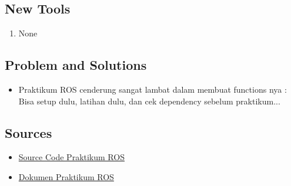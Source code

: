 \documentclass{article}
\begin{document}
\subsection{New Tools}
\begin{enumerate}
    \item None
\end{enumerate}

\subsection{Problem and Solutions}
\begin{itemize}
    \item Praktikum ROS cenderung sangat lambat dalam membuat functions nya : Bisa setup dulu, latihan dulu, dan cek dependency sebelum praktikum... 
\end{itemize}

\subsection{Sources}
\begin{itemize}
    \item \href{https://github.com/BrianHadianSTEI23/CaRSC_19623254_PrakROS}{Source Code Praktikum ROS}
    \item \href{https://docs.google.com/document/d/12mYMcLWI9S0xcYhLUiTBNpxYLnoE0uDCo_HX5BvlLVs/edit?tab=t.0}{Dokumen Praktikum ROS}
\end{itemize}
\end{document}
